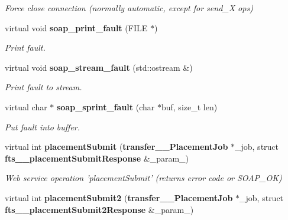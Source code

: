 \begin{DoxyCompactItemize}
\begin{DoxyCompactList}\small\item\em Force close connection (normally automatic, except for send\_\-X ops) \item\end{DoxyCompactList}\item 
virtual void {\bf soap\_\-print\_\-fault} (FILE $\ast$)\label{classFileTransferSoapBindingProxy_a32c3234408f0fae1558b3300979c2c22}

\begin{DoxyCompactList}\small\item\em Print fault. \item\end{DoxyCompactList}\item 
virtual void {\bf soap\_\-stream\_\-fault} (std::ostream \&)\label{classFileTransferSoapBindingProxy_a9777244fc33e12f1dadf6612d1104725}

\begin{DoxyCompactList}\small\item\em Print fault to stream. \item\end{DoxyCompactList}\item 
virtual char $\ast$ {\bf soap\_\-sprint\_\-fault} (char $\ast$buf, size\_\-t len)\label{classFileTransferSoapBindingProxy_ac1ceea6b8908256f729f36df2ce84cd8}

\begin{DoxyCompactList}\small\item\em Put fault into buffer. \item\end{DoxyCompactList}\item 
virtual int {\bf placementSubmit} ({\bf transfer\_\-\_\-PlacementJob} $\ast$\_\-job, struct {\bf fts\_\-\_\-placementSubmitResponse} \&\_\-param\_)\label{classFileTransferSoapBindingProxy_a30cdbe874c532dbfb3cfdc9cef76b29f}

\begin{DoxyCompactList}\small\item\em Web service operation 'placementSubmit' (returns error code or SOAP\_\-OK) \item\end{DoxyCompactList}\item 
virtual int {\bf placementSubmit2} ({\bf transfer\_\-\_\-PlacementJob} $\ast$\_\-job, struct {\bf fts\_\-\_\-placementSubmit2Response} \&\_\-param\_)\label{classFileTransferSoapBindingProxy_a95ae86beb66f856f1eeb560bb090c1e6}


\end{DoxyCompactItemize}
